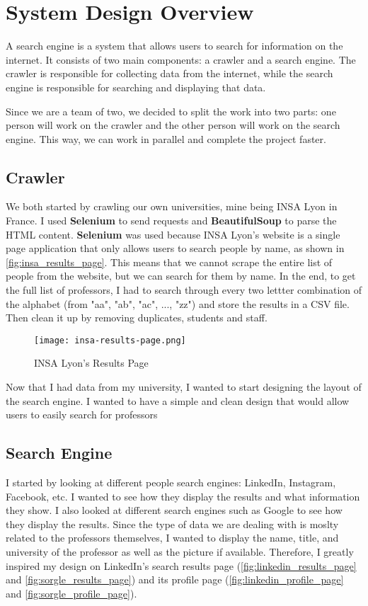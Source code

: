 \section{System Design Overview}

A search engine is a system that allows users to search for information on the internet. It consists of two main components: a crawler and a search engine. The crawler is responsible for collecting data from the internet, while the search engine is responsible for searching and displaying that data.

Since we are a team of two, we decided to split the work into two parts: one person will work on the crawler and the other person will work on the search engine. This way, we can work in parallel and complete the project faster.

\subsection{Crawler}

We both started by crawling our own universities, mine being INSA Lyon in France. I used \textbf{Selenium} to send requests and \textbf{BeautifulSoup} to parse the HTML content. \textbf{Selenium} was used because INSA Lyon's website is a single page application that only allows users to search people by name, as shown in \autoref{fig:insa_results_page}. This means that we cannot scrape the entire list of people from the website, but we can search for them by name. In the end, to get the full list of professors, I had to search through every two lettter combination of the alphabet (from "aa", "ab", "ac", ..., "zz") and store the results in a CSV file. Then clean it up by removing duplicates, students and staff.

\begin{figure}[ht]
	\centering
	\texttt{[image: insa-results-page.png]}
	\caption{INSA Lyon's Results Page}
	\label{fig:insa_results_page}
\end{figure}

Now that I had data from my university, I wanted to start designing the layout of the search engine. I wanted to have a simple and clean design that would allow users to easily search for professors

\subsection{Search Engine}

I started by looking at different people search engines: LinkedIn, Instagram, Facebook, etc. I wanted to see how they display the results and what information they show. I also looked at different search engines such as Google to see how they display the results. Since the type of data we are dealing with is moslty related to the professors themselves, I wanted to display the name, title, and university of the professor as well as the picture if available. Therefore, I greatly inspired my design on LinkedIn's search results page (\autoref{fig:linkedin_results_page} and \autoref{fig:sorgle_results_page}) and its profile page (\autoref{fig:linkedin_profile_page} and \autoref{fig:sorgle_profile_page}).

